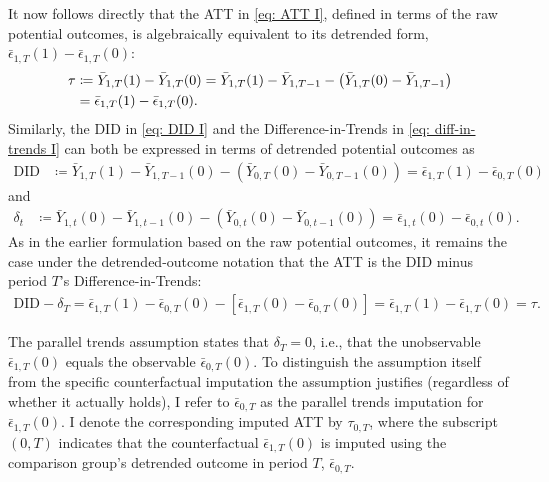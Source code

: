\documentclass[twoside,11pt]{article}
\begin{document}
It now follows directly that the \textrm{ATT} in \eqref{eq: ATT I}, defined in terms of the raw potential outcomes, is algebraically equivalent to its detrended form, $\bar{\epsilon}_{1,T}(1) - \bar{\epsilon}_{1,T}(0)$:
\begin{align} 
\tau & \coloneqq \bar{Y}_{1,T}(1) - \bar{Y}_{1,T}(0)  = \bar{Y}_{1,T}(1) - \bar{Y}_{1,T-1} - \left(\bar{Y}_{1,T}(0) - \bar{Y}_{1,T-1}\right) \notag \\ 
& = \bar{\epsilon}_{1,T}(1) - \bar{\epsilon}_{1,T}(0). \label{eq: ATT V}
\end{align} 
Similarly, the \textrm{DID} in \eqref{eq: DID I} and the Difference-in-Trends in \eqref{eq: diff-in-trends I} can both be expressed in terms of detrended potential outcomes as
\begin{align}
\textrm{DID} & \coloneqq \bar{Y}_{1,T}(1) - \bar{Y}_{1,T-1}(0) - \left(\bar{Y}_{0,T}(0) - \bar{Y}_{0,T-1}(0)\right) = \bar{\epsilon}_{1,T}(1) - \bar{\epsilon}_{0,T}(0) \label{eq: DID II}
\end{align}
and
\begin{align}
\delta_t & \coloneqq \bar{Y}_{1,t}(0) - \bar{Y}_{1,t-1}(0) - \left(\bar{Y}_{0,t}(0) - \bar{Y}_{0,t-1}(0)\right) = \bar{\epsilon}_{1,t}(0) - \bar{\epsilon}_{0,t}(0). \label{eq: diff-in-trends II}
\end{align}
As in the earlier formulation based on the raw potential outcomes, it remains the case under the detrended-outcome notation that the \textrm{ATT} is the \textrm{DID} minus period $T$'s Difference-in-Trends:
\begin{align} \label{eq: ATT VI}
\textrm{DID} - \delta_T = \bar{\epsilon}_{1,T}(1) - \bar{\epsilon}_{0,T}(0) - \left[\bar{\epsilon}_{1,T}(0) - \bar{\epsilon}_{0,T}(0)\right] = \bar{\epsilon}_{1,T}(1) - \bar{\epsilon}_{1,T}(0) = \tau.
\end{align}

The parallel trends assumption states that $\delta_T = 0$, i.e., that the unobservable $\bar{\epsilon}_{1,T}(0)$ equals the observable $\bar{\epsilon}_{0,T}(0)$. To distinguish the assumption itself from the specific counterfactual imputation the assumption justifies (regardless of whether it actually holds), I refer to $\bar{\epsilon}_{0,T}$ as the parallel trends imputation for $\bar{\epsilon}_{1,T}(0)$. I denote the corresponding imputed \textrm{ATT} by $\tau_{0,T}$, where the subscript $(0,T)$ indicates that the counterfactual $\bar{\epsilon}_{1,T}(0)$ is imputed using the comparison group's detrended outcome in period $T$, $\bar{\epsilon}_{0,T}$.
\end{document}
